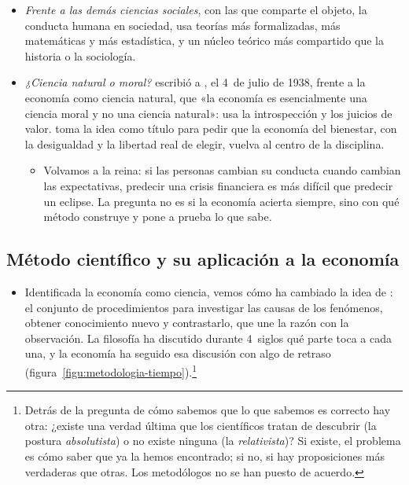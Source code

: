 \documentclass[11pt]{article}
\begin{document}
\begin{itemize}
\item \emph{Frente a las demás ciencias sociales}, con las que comparte el objeto, la conducta humana en sociedad, usa teorías más formalizadas, más matemáticas y más estadística, y un núcleo teórico más compartido que la historia o la sociología.
\item \emph{¿Ciencia natural o moral?}  escribió a , el 4~de julio de 1938, frente a la economía como ciencia natural, que «la economía es esencialmente una ciencia moral y no una ciencia natural»: usa la introspección y los juicios de valor\nocite{Keynes1938Harrod}. \textcite{Atkinson2009Moral} toma la idea como título para pedir que la economía del bienestar, con la desigualdad y la libertad real de elegir, vuelva al centro de la disciplina.
  \begin{itemize}
  \item Volvamos a la reina: si las personas cambian su conducta cuando cambian las expectativas, predecir una crisis financiera es más difícil que predecir un eclipse. La pregunta no es si la economía acierta siempre, sino con qué método construye y pone a prueba lo que sabe.
  \end{itemize}
\end{itemize}

\subsection{Método científico y su aplicación a la economía}\label{sec:metodo-cientifico}

\begin{itemize}
\item Identificada la economía como ciencia, vemos cómo ha cambiado la idea de : el conjunto de procedimientos para investigar las causas de los fenómenos, obtener conocimiento nuevo y contrastarlo, que une la razón con la observación. La filosofía ha discutido durante 4~siglos qué parte toca a cada una, y la economía ha seguido esa discusión con algo de retraso (figura~\ref{figu:metodologia-tiempo}).\footnote{Detrás de la pregunta de cómo sabemos que lo que sabemos es correcto hay otra: ¿existe una verdad última que los científicos tratan de descubrir (la postura \emph{absolutista}) o no existe ninguna (la \emph{relativista})? Si existe, el problema es cómo saber que ya la hemos encontrado; si no, si hay proposiciones más verdaderas que otras. Los metodólogos no se han puesto de acuerdo\nocite{LandrethColander2006Historia}.}
\end{itemize}
\end{document}

